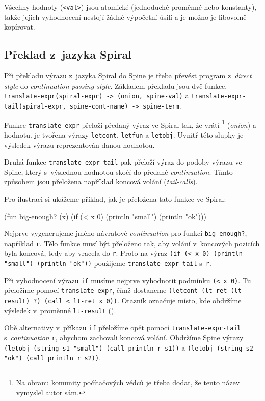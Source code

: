 Všechny hodnoty (\texttt{<val>}) jsou atomické (jednoduché proměnné nebo
konstanty), takže jejich vyhodnocení nestojí žádné výpočetní úsilí a je možno je
libovolně kopírovat.

\subsection{Překlad z~jazyka Spiral}

Při překladu výrazu z~jazyka Spiral do Spine je třeba převést program
z~\emph{direct style} do \emph{continuation-passing style}. Základem překladu
jsou dvě funkce, \texttt{translate-expr(spiral-expr) -> (onion, spine-val)} a
\texttt{translate-expr-tail(spiral-expr, spine-cont-name) -> spine-term}.

Funkce \texttt{translate-expr} přeloží předaný výraz ve Spiral tak, že vrátí
\footnote{Na obranu komunity počítačových vědců je třeba dodat, že
tento název vymyslel autor sám.} (\emph{onion}) a hodnotu.  je
tvořena výrazy \texttt{letcont}, \texttt{letfun} a \texttt{letobj}. Uvnitř této
slupky je výsledek výrazu reprezentován danou hodnotou.

Druhá funkce \texttt{translate-expr-tail} pak přeloží výraz do podoby výrazu ve
Spine, který s~výslednou hodnotou skočí do předané \emph{continuation}. Tímto
způsobem jsou přeložena například koncová volání (\emph{tail-calls}).

Pro ilustraci si ukážeme příklad, jak je přeložena tato funkce ve Spiral:

\begin{spiral}
(fun big-enough? (x)
  (if (< x 0)
    (println "small")
    (println "ok")))
\end{spiral}

Nejprve vygenerujeme jméno návratové \emph{continuation} pro funkci
\texttt{big-enough?}, například \texttt{r}. Tělo funkce musí být přeloženo tak,
aby volání v~koncových pozicích byla koncová, tedy aby vracela do \texttt{r}.
Proto na výraz \texttt{(if (< x 0) (println "small") (println "ok"))} použijeme
\texttt{translate-expr-tail} s~\texttt{r}.

Při vyhodnocení výrazu \texttt{if} musíme nejprve vyhodnotit podmínku \texttt{(<
x 0)}. Tu přeložíme pomocí \texttt{translate-expr}, čímž dostaneme 
\texttt{(letcont (lt-ret (lt-result) ?) (call < lt-ret x 0))}. Otazník označuje
místo, kde obdržíme výsledek v~proměnné \texttt{lt-result} ().

Obě alternativy v~příkazu \texttt{if} přeložíme opět pomocí
\texttt{translate-expr-tail} s~\emph{continuation} \texttt{r}, abychom zachovali
koncová volání. Obdržíme Spine výrazy \texttt{(letobj (string s1 "small") (call
println r s1))} a \texttt{(letobj (string s2 "ok") (call println r s2))}.

